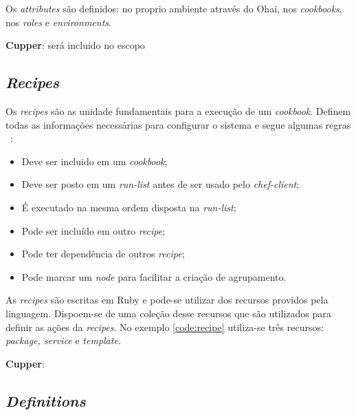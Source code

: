 Os \textit{attributes} são definidos: no proprio ambiente através do Ohai, nos \textit{cookbooks},
nos \textit{roles} e \textit{environments}.

\textbf{Cupper}: será incluido no escopo

\subsection{\textit{Recipes}}
\label{sec:lev-rec-rec}

Os \textit{recipes} são as unidade fundamentais para a execução de um \textit{cookbook}. Definem
todas as informações necessárias para configurar o sistema e segue algumas regras
~\cite{chefdoc:2016}:

\begin{itemize}
  \item Deve ser incluido em um \textit{cookbook};
  \item Deve ser posto em um \textit{run-list} antes de ser usado pelo \textit{chef-client};
  \item É executado na mesma ordem disposta na \textit{run-list};
  \item Pode ser incluído em outro \textit{recipe};
  \item Pode ter dependência de outros \textit{recipe};
  \item Pode marcar um \textit{node} para facilitar a criação de agrupamento.
\end{itemize}

As \textit{recipes} são escritas em Ruby e pode-se utilizar dos recursos providos
pela linguagem. Dispoem-se de uma coleção desse recursos que são utilizados
para definir as ações da \textit{recipes}. No exemplo \ref{code:recipe} utiliza-se
três recursos: \textit{package, service} e \textit{template}.

\begin{minipage}{.90\textwidth}
  \lstset{style=shell}
  
\end{minipage}

\textbf{Cupper}:

\subsection{\textit{Definitions}}
\label{sec:lev-rec-def}

